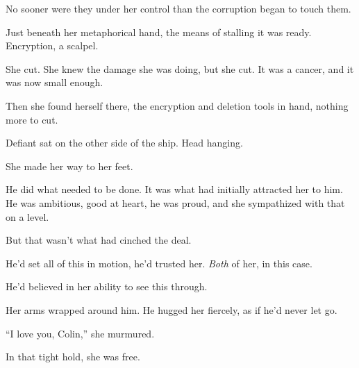 No sooner were they under her control than the corruption began to touch them.



Just beneath her metaphorical hand, the means of stalling it was ready.  Encryption, a scalpel.



She cut.  She knew the damage she was doing, but she cut.  It was a cancer, and it was now small enough.



Then she found herself there, the encryption and deletion tools in hand, nothing more to cut.



Defiant sat on the other side of the ship.  Head hanging.



She made her way to her feet.



He did what needed to be done.  It was what had initially attracted her to him.  He was ambitious, good at heart, he was proud, and she sympathized with that on a level.



But that wasn't what had cinched the deal.



He'd set all of this in motion, he'd trusted her.  \emph{Both} of her, in this case.



He'd believed in her ability to see this through.



Her arms wrapped around him.  He hugged her fiercely, as if he'd never let go.



``I love you, Colin,'' she murmured.



In that tight hold, she was free.






